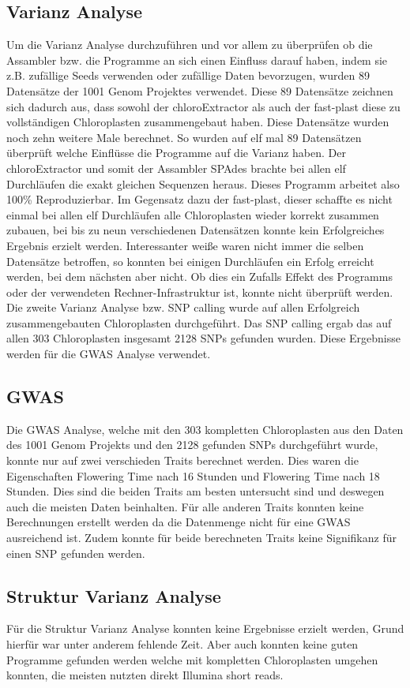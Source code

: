 \documentclass{scrartcl}
\begin{document}
\subsection{Varianz Analyse}
\label{sec-3-7}
Um die Varianz Analyse durchzuführen und vor allem zu überprüfen ob die Assambler bzw. die Programme an sich einen Einfluss darauf haben, indem sie z.B. zufällige Seeds verwenden oder zufällige Daten bevorzugen, wurden 89 Datensätze
der 1001 Genom Projektes verwendet. Diese 89 Datensätze zeichnen sich dadurch aus, dass sowohl der chloroExtractor als auch der fast-plast diese zu vollständigen Chloroplasten zusammengebaut haben. Diese Datensätze
wurden noch zehn weitere Male berechnet. So wurden auf elf mal 89 Datensätzen überprüft welche Einflüsse die Programme auf die Varianz haben. Der chloroExtractor und somit der Assambler SPAdes brachte bei allen elf
Durchläufen die exakt gleichen Sequenzen heraus. Dieses Programm arbeitet also 100\% Reproduzierbar. Im Gegensatz dazu der fast-plast, dieser schaffte es nicht einmal bei allen elf Durchläufen alle Chloroplasten wieder
korrekt zusammen zubauen, bei bis zu neun verschiedenen Datensätzen konnte kein Erfolgreiches Ergebnis erzielt werden. Interessanter weiße waren nicht immer die selben Datensätze betroffen, so konnten bei einigen Durchläufen
ein Erfolg erreicht werden, bei dem nächsten aber nicht. Ob dies ein Zufalls Effekt des Programms oder der verwendeten Rechner-Infrastruktur ist, konnte nicht überprüft werden.
Die zweite Varianz Analyse bzw. SNP calling wurde auf allen Erfolgreich zusammengebauten Chloroplasten durchgeführt. Das SNP calling ergab das auf allen 303 Chloroplasten insgesamt 2128 SNPs gefunden wurden. 
Diese Ergebnisse werden für die GWAS Analyse verwendet.
\subsection{GWAS}
\label{sec-3-8}
Die GWAS Analyse, welche mit den 303 kompletten Chloroplasten aus den Daten des 1001 Genom Projekts und den 2128 gefunden SNPs durchgeführt wurde, konnte nur auf zwei verschieden Traits berechnet werden. Dies waren 
die Eigenschaften Flowering Time nach 16 Stunden und Flowering Time nach 18 Stunden. Dies sind die beiden Traits am besten untersucht sind und deswegen auch die meisten Daten beinhalten. Für alle anderen Traits konnten
keine Berechnungen erstellt werden da die Datenmenge nicht für eine GWAS ausreichend ist. Zudem konnte für beide berechneten Traits keine Signifikanz für einen SNP gefunden werden.
\subsection{Struktur Varianz Analyse}
\label{sec-3-9}
Für die Struktur Varianz Analyse konnten keine Ergebnisse erzielt werden, Grund hierfür war unter anderem fehlende Zeit. Aber auch konnten keine guten Programme gefunden werden welche mit kompletten Chloroplasten
umgehen konnten, die meisten nutzten direkt Illumina short reads. 
\end{document}
